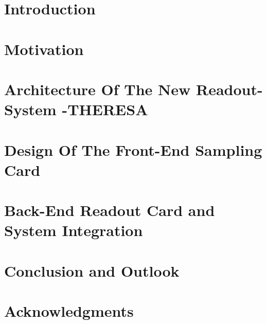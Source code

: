 \documentclass[dvipsnames,table]{include/thesisclass} %
\begin{document}
    \FrontMatter
    
	\tikzexternaldisable
    
    \tikzexternalenable
    
       
	
    \begingroup      %
    \tableofcontents %
    \listoffigures
    \listoftables
    \printglossary
    \endgroup
    \cleardoublepage
    \glsresetall

    \MainMatter
    \chapter{Introduction}
    		
    \chapter{Motivation}\label{chap:motivation}
    		
   	\chapter{Architecture Of The New Readout-System -THERESA}\label{chap:new_sys}
   			
   	\chapter{Design Of The Front-End Sampling Card}\label{chap:samplingboard}
   			
   	\chapter{Back-End Readout Card and System Integration}\label{chap:readout}
   				
	\glsresetall
    \chapter{Conclusion and Outlook}
   					
	\chapter*{Acknowledgments}
			
	
    \Appendix
    \chapter*{\appendixname} 
    		

	\TheBibliography
	
	
\end{document}
